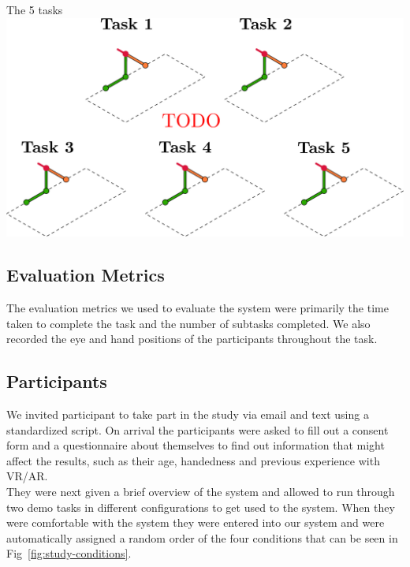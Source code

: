 \begin{figureBox}[label={fig:tasks}, width=1.0\linewidth]{The 5 tasks}
    \includegraphics[width = 0.8\linewidth]{./implementation/figures/tasks.pdf}
\end{figureBox}

\subsection{Evaluation Metrics}
The evaluation metrics we used to evaluate the system were primarily the time taken to complete the task and the number of subtasks completed. We also recorded the eye and hand positions of the participants throughout the task.


\subsection{Participants}
We invited participant to take part in the study via email and text using a standardized script. On arrival the participants were asked to fill out a consent form and a questionnaire about themselves to find out information that might affect the results, such as their age, handedness and previous experience with VR/AR. \\   

They were next given a brief overview of the system and allowed to run through two demo tasks in different configurations to get used to the system. When they were comfortable with the system they were entered into our system and were automatically assigned a random order of the four conditions that can be seen in Fig~\ref{fig:study-conditions}. 

